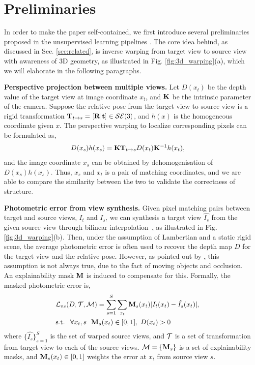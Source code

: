 \vspace{-0.7\baselineskip}
\section{Preliminaries}
\label{sec:preliminaries}
\vspace{-0.3\baselineskip}

In order to make the paper self-contained, we first introduce several preliminaries proposed in the unsupervised learning pipelines \cite{zhou2017unsupervised,godard2016unsupervised}. The core idea behind, as discussed in Sec. \ref{sec:related}, is inverse warping from target view to source view with awareness of 3D geometry, as illustrated in Fig. \ref{fig:3d_warping}(a), which we will elaborate in the following paragraphs.


\textbf{Perspective projection between multiple views.}
Let $D(x_t)$ be the depth value of the target view at image coordinate $x_t$, and ${\mathbf K}$ be the intrinsic parameter of the camera. Suppose the relative pose from the target view to source view is a rigid transformation ${\mathbf T}_{t\rightarrow s} = [{\mathbf R} | {\mathbf t}] \in {\mathcal S}{\mathcal E}(3)$, and $h(x)$ is the homogeneous coordinate given $x$. The perspective warping to localize corresponding pixels can be formulated as, 
\begin{align}
\label{eqn:warp}
D(x_s)h(x_s) = {\mathbf K}{\mathbf T}_{t\rightarrow s}D(x_t){\mathbf K}^{-1}h(x_t),
\end{align}
and the image coordinate $x_s$ can be obtained by dehomogenisation of $D(x_s)h(x_s)$. Thus, $x_s$ and $x_t$ is a pair of matching coordinates, and we are able to compare the similarity between the two to validate the correctness of structure.


\textbf{Photometric error from view synthesis.} 
\label{chap:warping}
Given pixel matching pairs between target and source views, \ie $I_t$ and $I_s$, we can synthesis a target view $\hat{I_s}$ from the given source view through bilinear interpolation~\cite{GargBR16}, as illustrated in Fig. \ref{fig:3d_warping}(b). 
Then, under the assumption of Lambertian and a static rigid scene, the average photometric error is often used to recover the depth map $D$ for the target view and the relative pose. 
However, as pointed out by \cite{zhou2017unsupervised}, this assumption is not always true, due to the fact of moving objects and occlusion. An explainability mask ${\mathbf M}$ is induced to compensate for this. Formally, the masked photometric error is,
\begin{align}
\label{eqn:photometric}
& {\mathcal L}_{vs}(D, {\mathcal T}, {\mathcal M}) = \sum_{s=1}^{S}\sum_{x_t}{\mathbf M}_s(x_t)|I_t(x_t) - \hat{I_s}(x_t)|, \nonumber \\
& \text{s.t. ~} \forall x_t, s\text{~~} {\mathbf M}_s(x_t)\in [0, 1],\text{~} D(x_t) > 0
\end{align}
where $\{\hat{I_s}\}_{s=1}^{S}$ is the set of warped source views, and ${\mathcal T}$ is a set of transformation from target view to each of the source views. 
${\mathcal M} = \{{\mathbf M}_s\}$ is a set of explainability masks, and ${\mathbf M}_s(x_t) \in [0, 1]$ weights the error at $x_t$ from source view $s$.

